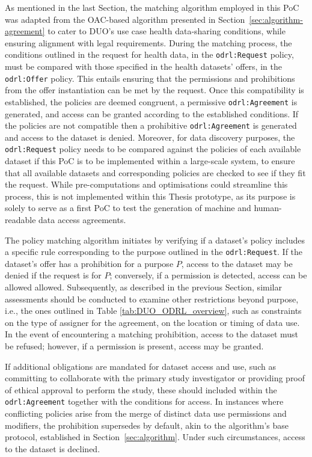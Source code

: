 As mentioned in the last Section, the matching algorithm employed in this PoC was adapted from the OAC-based algorithm presented in Section~\ref{sec:algorithm-agreement} to cater to DUO's use case health data-sharing conditions, while ensuring alignment with legal requirements.
During the matching process, the conditions outlined in the request for health data, in the \texttt{odrl:Request} policy, must be compared with those specified in the health datasets' offers, in the \texttt{odrl:Offer} policy.
This entails ensuring that the permissions and prohibitions from the offer instantiation can be met by the request.
Once this compatibility is established, the policies are deemed congruent, a permissive \texttt{odrl:Agreement} is generated, and access can be granted according to the established conditions.
If the policies are not compatible then a prohibitive \texttt{odrl:Agreement} is generated and access to the dataset is denied.
Moreover, for data discovery purposes, the \texttt{odrl:Request} policy needs to be compared against the policies of each available dataset if this PoC is to be implemented within a large-scale system, to ensure that all available datasets and corresponding policies are checked to see if they fit the request.
While pre-computations and optimisations could streamline this process, this is not implemented within this Thesis prototype, as its purpose is solely to serve as a first PoC to test the generation of machine and human-readable data access agreements.

The policy matching algorithm initiates by verifying if a dataset's policy includes a specific rule corresponding to the purpose outlined in the \texttt{odrl:Request}. 
If the dataset's offer has a prohibition for a purpose $P$, access to the dataset may be denied if the request is for $P$; conversely, if a permission is detected, access can be allowed allowed.
Subsequently, as described in the previous Section, similar assessments should be conducted to examine other restrictions beyond purpose, i.e., the ones outlined in Table \ref{tab:DUO_ODRL_overview}, such as constraints on the type of assigner for the agreement, on the location or timing of data use.
In the event of encountering a matching prohibition, access to the dataset must be refused; however, if a permission is present, access may be granted.

If additional obligations are mandated for dataset access and use, such as committing to collaborate with the primary study investigator or providing proof of ethical approval to perform the study, these should included within the \texttt{odrl:Agreement} together with the conditions for access.
In instances where conflicting policies arise from the merge of distinct data use permissions and modifiers, the prohibition supersedes by default, akin to the algorithm's base protocol, established in Section~\ref{sec:algorithm}.
Under such circumstances, access to the dataset is declined.

